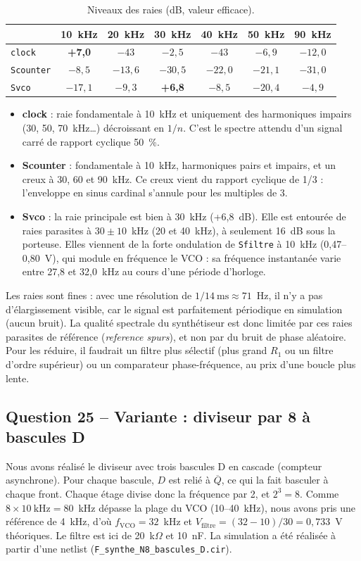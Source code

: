 \begin{table}[H]
\centering
\caption{Niveaux des raies (dB, valeur efficace).}
\label{tab:fft}
\begin{tabular}{lcccccc}
\toprule
 & 10~kHz & 20~kHz & 30~kHz & 40~kHz & 50~kHz & 90~kHz\\
\midrule
\texttt{clock}    & \textbf{+7,0} & $-43$ & $-2{,}5$ & $-43$ & $-6{,}9$ & $-12{,}0$\\
\texttt{Scounter} & \textbf{$-8{,}5$} & $-13{,}6$ & $-30{,}5$ & $-22{,}0$ & $-21{,}1$ & $-31{,}0$\\
\texttt{Svco}     & $-17{,}1$ & $-9{,}3$ & \textbf{+6,8} & $-8{,}5$ & $-20{,}4$ & $-4{,}9$\\
\bottomrule
\end{tabular}
\end{table}

\begin{itemize}
  \item \textbf{clock} : raie fondamentale à 10~kHz et uniquement des harmoniques impairs
        (30, 50, 70~kHz\dots) décroissant en $1/n$. C'est le spectre attendu d'un signal carré
        de rapport cyclique 50~\%.
  \item \textbf{Scounter} : fondamentale à 10~kHz, harmoniques pairs et impairs, et un creux à
        30, 60 et 90~kHz. Ce creux vient du rapport cyclique de 1/3 : l'enveloppe en sinus
        cardinal s'annule pour les multiples de 3.
  \item \textbf{Svco} : la raie principale est bien à 30~kHz (+6,8~dB). Elle est entourée de
        raies parasites à $30 \pm 10$~kHz (20 et 40~kHz), à seulement 16~dB sous la porteuse.
        Elles viennent de la forte ondulation de \texttt{Sfiltre} à 10~kHz (0,47--0,80~V), qui
        module en fréquence le VCO : sa fréquence instantanée varie entre 27,8 et 32,0~kHz
        au cours d'une période d'horloge.
\end{itemize}
Les raies sont fines : avec une résolution de $1/14~\text{ms} \approx 71$~Hz, il n'y a pas
d'élargissement visible, car le signal est parfaitement périodique en simulation (aucun bruit).
La qualité spectrale du synthétiseur est donc limitée par ces raies parasites de référence
(\emph{reference spurs}), et non par du bruit de phase aléatoire. Pour les réduire, il faudrait
un filtre plus sélectif (plus grand $R_1$ ou un filtre d'ordre supérieur) ou un comparateur
phase-fréquence, au prix d'une boucle plus lente.

\subsection{Question 25 -- Variante : diviseur par 8 à bascules D}
Nous avons réalisé le diviseur avec trois bascules D en cascade (compteur asynchrone). Pour
chaque bascule, $D$ est relié à $\overline{Q}$, ce qui la fait basculer à chaque front. Chaque
étage divise donc la fréquence par 2, et $2^3 = 8$. Comme $8 \times 10~\text{kHz} = 80$~kHz
dépasse la plage du VCO (10--40~kHz), nous avons pris une référence de 4~kHz, d'où
$f_{\text{VCO}} = 32$~kHz et $V_{\text{filtre}} = (32-10)/30 = 0{,}733$~V théoriques. Le filtre
est ici de 20~k$\Omega$ et 10~nF. La simulation a été réalisée à partir d'une netlist
(\texttt{F\_synthe\_N8\_bascules\_D.cir}).

